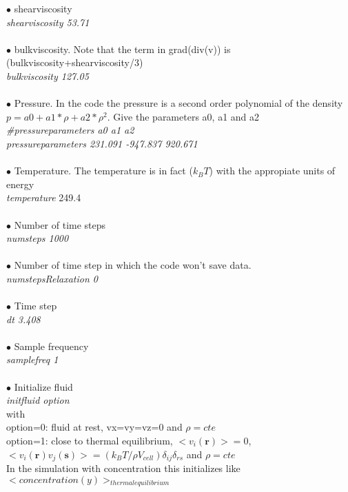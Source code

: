 \documentclass[aps,prl]{revtex4}
\begin{document}
$\bullet$ shearviscosity \\
\emph{shearviscosity          53.71} \\ \\
$\bullet$ bulkviscosity. Note that the term in grad(div(v)) is (bulkviscosity+shearviscosity/3) \\
\emph{bulkviscosity           127.05} \\ \\
$\bullet$ Pressure. In the code the pressure is a second order polynomial of the density
$p = a0 + a1*\rho + a2*\rho^2$. Give the parameters a0, a1 and a2 \\
\emph{\#pressureparameters a0 a1 a2} \\ 
\emph{pressureparameters 231.091   -947.837   920.671} \\ \\
$\bullet$ Temperature. The temperature is in fact ($k_BT$) with the appropiate units of 
energy \\
\emph{temperature} 249.4 \\ \\
$\bullet$ Number of time steps \\
\emph{numsteps                1000} \\ \\
$\bullet$ Number of time step in which the code won't save data. \\
\emph{numstepsRelaxation	0} \\ \\
$\bullet$ Time step \\
\emph{dt                     	3.408} \\\\
$\bullet$ Sample frequency \\
\emph{samplefreq              1} \\\\
$\bullet$ Initialize fluid \\
\emph{initfluid option} \\
with \\
option=0: fluid at rest, vx=vy=vz=0 and $\rho=cte$ \\
option=1: close to thermal equilibrium, $<v_i(\mathbf{r})>=0$, 
$<v_i(\mathbf{r}) v_j(\mathbf{s})>=(k_BT/\rho V_{cell}) \delta_{ij} \delta_{rs}$ and $\rho=cte$ \\
In the simulation with concentration this initializes like $<concentration(y)>_{thermal equilibrium}$ \\ \\
\end{document}
